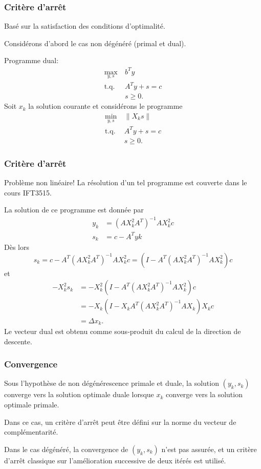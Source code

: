 \documentclass[usepdftitle=false]{beamer}
\begin{document}
\begin{frame}
\frametitle{Critère d’arrêt}

Basé sur la satisfaction des conditions d'optimalité.

\mbox{}

Considérons d’abord le cas non dégénéré (primal et dual).

\mbox{}

Programme dual:
\begin{align*}
\max_{y,s} \ & b^Ty \\
\mbox{t.q. } & A^Ty + s = c \\
& s \geq 0.
\end{align*}
Soit $x_k$ la solution courante et considérons le programme
\begin{align*}
\min_{y,s} \ & \| X_ks \| \\
\mbox{t.q. } & A^Ty + s = c \\
& s \geq 0.
\end{align*}

\end{frame}

\begin{frame}
\frametitle{Critère d’arrêt}

Problème non linéaire! La résolution d'un tel programme est couverte dans le cours IFT3515.

\mbox{}

La solution de ce programme est donnée par
\begin{align*}
y_k &= (AX^2_kA^T)^{-1}AX^2_kc \\
s_k &= c - A^Tyk
\end{align*}
Dès lors
$$
s_k = c - A^T(AX^2_kA^T)^{-1}AX^2_kc = (I - A^T(AX^2_kA^T)^{-1}AX^2_k)c
$$
et
\begin{align*}
-X^2_ks_k &= -X^2_k(I - A^T(AX^2_kA^T)^{-1}AX^2_k)c \\
&= -X_k(I - X_kA^T(AX^2_kA^T)^{-1}AX_k)X_kc \\
&= \Delta x_k.
\end{align*}
Le vecteur dual est obtenu comme sous-produit du calcul
de la direction de descente.

\end{frame}

\begin{frame}
\frametitle{Convergence}

Sous l'hypothèse de non dégénérescence primale et duale, la solution $(y_k, s_k)$ converge vers la solution optimale duale lorsque $x_k$ converge vers la solution optimale primale.

\mbox{}

Dans ce cas, un critère d'arrêt peut être défini sur la norme
du vecteur de complémentarité.

\mbox{}

Dans le cas dégénéré, la convergence de $(y_k, s_k)$ n'est pas assurée, et un critère d'arrêt classique sur l'amélioration successive de deux itérés est utilisé.

\end{frame}
\end{document}
